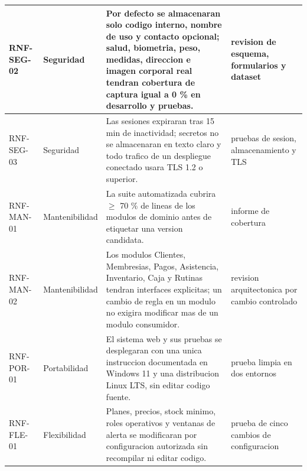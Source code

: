 \documentclass[11pt,a4paper,twoside]{article}
\begin{document}
\begin{longtable}{p{1.8cm}p{2.2cm}p{6.5cm}p{3.7cm}}
RNF-SEG-02 & Seguridad & Por defecto se almacenaran solo codigo interno, nombre de uso y contacto opcional; salud, biometria, peso, medidas, direccion e imagen corporal real tendran cobertura de captura igual a 0 \% en desarrollo y pruebas. & revision de esquema, formularios y dataset \\ \hline
RNF-SEG-03 & Seguridad & Las sesiones expiraran tras 15 min de inactividad; secretos no se almacenaran en texto claro y todo trafico de un despliegue conectado usara TLS 1.2 o superior. & pruebas de sesion, almacenamiento y TLS \\ \hline
RNF-MAN-01 & Mantenibilidad & La suite automatizada cubrira $\geq$ 70 \% de lineas de los modulos de dominio antes de etiquetar una version candidata. & informe de cobertura \\ \hline
RNF-MAN-02 & Mantenibilidad & Los modulos Clientes, Membresias, Pagos, Asistencia, Inventario, Caja y Rutinas tendran interfaces explicitas; un cambio de regla en un modulo no exigira modificar mas de un modulo consumidor. & revision arquitectonica por cambio controlado \\ \hline
RNF-POR-01 & Portabilidad & El sistema web y sus pruebas se desplegaran con una unica instruccion documentada en Windows 11 y una distribucion Linux LTS, sin editar codigo fuente. & prueba limpia en dos entornos \\ \hline
RNF-FLE-01 & Flexibilidad & Planes, precios, stock minimo, roles operativos y ventanas de alerta se modificaran por configuracion autorizada sin recompilar ni editar codigo. & prueba de cinco cambios de configuracion \\ \hline
\end{longtable}
\normalsize
\end{document}
